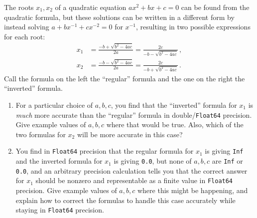 \documentclass[12pt]{article}
\begin{document}
The roots $x_1,x_2$ of a quadratic equation $ax^2 + bx +c =0$ can be found from the quadratic formula, but these solutions can be written in a different form by instead solving $a + bx^{-1} + cx^{-2}=0$ for $x^{-1}$, resulting in two possible expressions for each root:
\begin{align*}
x_1 &= \frac{-b + \sqrt{b^2 - 4ac}}{2a} = \frac{2c}{-b - \sqrt{b^2 - 4ac}} \, , \\
x_2 &= \frac{-b - \sqrt{b^2 - 4ac}}{2a} = \frac{2c}{-b + \sqrt{b^2 - 4ac}} \, .
\end{align*}
Call the formula on the left the ``regular'' formula and the one on the right the ``inverted'' formula.
\begin{enumerate}
    \item For a particular choice of $a,b,c$, you find that the ``inverted'' formula for $x_1$ is \emph{much} more accurate than the ``regular'' formula in double/\texttt{Float64} precision.  Give example values of $a,b,c$ where that would be true.  Also, which of the two formulas for $x_2$ will be more accurate in this case?

    \item You find in \texttt{Float64} precision that the regular formula for $x_1$ is giving \texttt{Inf} and the inverted formula for $x_1$ is giving \texttt{0.0}, but none of $a,b,c$ are \texttt{Inf} or \texttt{0.0}, and an arbitrary precision calculation tells you that the correct answer for $x_1$ should be nonzero and representable as a finite value in \texttt{Float64} precision.   Give example values of $a,b,c$ where this might be happening, and explain how to correct the formulas to handle this case accurately while staying in \texttt{Float64} precision.
\end{enumerate}
\end{document}

